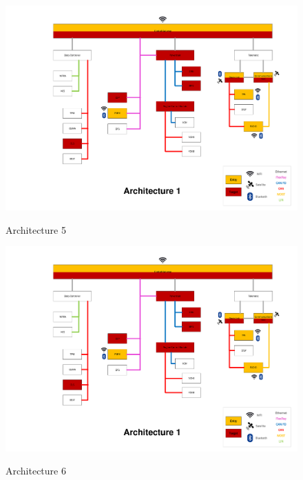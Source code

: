 \begin{figure}[h]
    \centering
    \caption{Architecture 5}
    \includegraphics[width=\textwidth, page=5]{../Architectures-survey.pdf}
    \label{fig:architecture5}
\end{figure}

\begin{figure}[h]
    \centering
    \caption{Architecture 6}
    \includegraphics[width=\textwidth, page=6]{../Architectures-survey.pdf}
    \label{fig:architecture6}
\end{figure}

